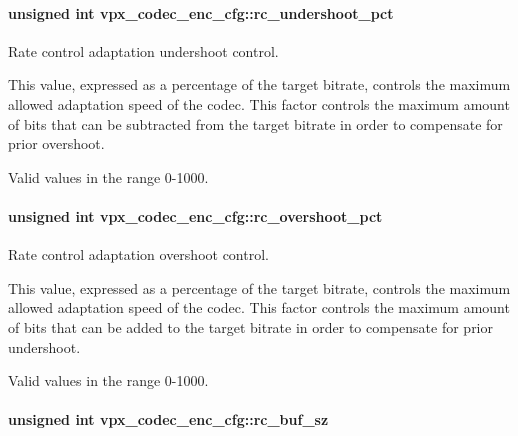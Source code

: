 \paragraph[{\texorpdfstring{rc\+\_\+undershoot\+\_\+pct}{rc_undershoot_pct}}]{\setlength{\rightskip}{0pt plus 5cm}unsigned int vpx\+\_\+codec\+\_\+enc\+\_\+cfg\+::rc\+\_\+undershoot\+\_\+pct}\hypertarget{structvpx__codec__enc__cfg_ad279fbb0a9fe9395340913161e28651a}{}\label{structvpx__codec__enc__cfg_ad279fbb0a9fe9395340913161e28651a}


Rate control adaptation undershoot control. 

This value, expressed as a percentage of the target bitrate, controls the maximum allowed adaptation speed of the codec. This factor controls the maximum amount of bits that can be subtracted from the target bitrate in order to compensate for prior overshoot.

Valid values in the range 0-\/1000. 
\paragraph[{\texorpdfstring{rc\+\_\+overshoot\+\_\+pct}{rc_overshoot_pct}}]{\setlength{\rightskip}{0pt plus 5cm}unsigned int vpx\+\_\+codec\+\_\+enc\+\_\+cfg\+::rc\+\_\+overshoot\+\_\+pct}\hypertarget{structvpx__codec__enc__cfg_a4f2fbd015c1b1f395cc4a4b03d4ead5f}{}\label{structvpx__codec__enc__cfg_a4f2fbd015c1b1f395cc4a4b03d4ead5f}


Rate control adaptation overshoot control. 

This value, expressed as a percentage of the target bitrate, controls the maximum allowed adaptation speed of the codec. This factor controls the maximum amount of bits that can be added to the target bitrate in order to compensate for prior undershoot.

Valid values in the range 0-\/1000. 
\paragraph[{\texorpdfstring{rc\+\_\+buf\+\_\+sz}{rc_buf_sz}}]{\setlength{\rightskip}{0pt plus 5cm}unsigned int vpx\+\_\+codec\+\_\+enc\+\_\+cfg\+::rc\+\_\+buf\+\_\+sz}\hypertarget{structvpx__codec__enc__cfg_a61866272bb588cd86d28834f420430f0}{}\label{structvpx__codec__enc__cfg_a61866272bb588cd86d28834f420430f0}



